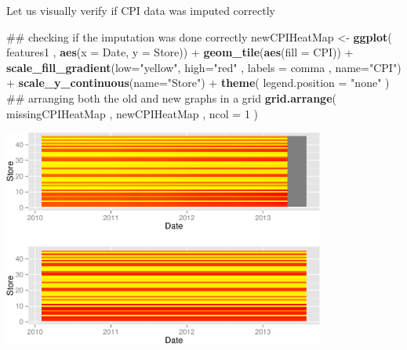 \documentclass[]{article}
\newenvironment{Shaded}{\begin{snugshade}}{\end{snugshade}}
\newcommand{\KeywordTok}[1]{\textcolor[rgb]{0.13,0.29,0.53}{\textbf{{#1}}}}
\newcommand{\DataTypeTok}[1]{\textcolor[rgb]{0.13,0.29,0.53}{{#1}}}
\newcommand{\DecValTok}[1]{\textcolor[rgb]{0.00,0.00,0.81}{{#1}}}
\newcommand{\StringTok}[1]{\textcolor[rgb]{0.31,0.60,0.02}{{#1}}}
\newcommand{\OtherTok}[1]{\textcolor[rgb]{0.56,0.35,0.01}{{#1}}}
\newcommand{\NormalTok}[1]{{#1}}
\begin{document}
\begin{Shaded}
\end{Shaded}

Let us visually verify if CPI data was imputed correctly

\begin{Shaded}
\begin{Highlighting}[]
\NormalTok{## checking if the imputation was done correctly}
\NormalTok{newCPIHeatMap <-}\StringTok{ }\KeywordTok{ggplot}\NormalTok{( features1 , }\KeywordTok{aes}\NormalTok{(}\DataTypeTok{x =} \NormalTok{Date, }\DataTypeTok{y =} \NormalTok{Store)) +}\StringTok{ }
\StringTok{  }\KeywordTok{geom_tile}\NormalTok{(}\KeywordTok{aes}\NormalTok{(}\DataTypeTok{fill =} \NormalTok{CPI)) +}
\StringTok{  }\KeywordTok{scale_fill_gradient}\NormalTok{(}\DataTypeTok{low=}\StringTok{"yellow"}\NormalTok{, }\DataTypeTok{high=}\StringTok{"red"} \NormalTok{, }\DataTypeTok{labels =} \NormalTok{comma , }\DataTypeTok{name=}\StringTok{"CPI"}\NormalTok{) +}
\StringTok{  }\KeywordTok{scale_y_continuous}\NormalTok{(}\DataTypeTok{name=}\StringTok{"Store"}\NormalTok{) +}
\StringTok{  }\KeywordTok{theme}\NormalTok{( }\DataTypeTok{legend.position =} \StringTok{"none"} \NormalTok{)}
\NormalTok{## arranging both the old and new graphs in a grid}
\KeywordTok{grid.arrange}\NormalTok{( missingCPIHeatMap , newCPIHeatMap , }\DataTypeTok{ncol =} \DecValTok{1} \NormalTok{)}
\end{Highlighting}
\end{Shaded}

\includegraphics[width=400px]{PredictingWeeklySalesAtWalmart_files/figure-latex/plottingNewCPI-1}
\end{document}
